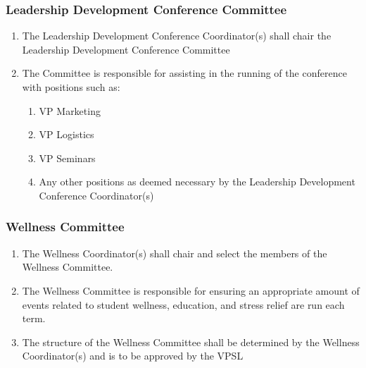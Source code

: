 \subsubsection{Leadership Development Conference Committee}
\label{leadership-development-conference-committee}
\begin{enumerate}
 \item
  The Leadership Development Conference Coordinator(s) shall chair the Leadership Development Conference Committee
 \item
  The Committee is responsible for assisting in the running of the conference with positions such as:

  \begin{enumerate}
   \item
    VP Marketing
   \item
    VP Logistics
   \item
    VP Seminars
   \item
    Any other positions as deemed necessary by the Leadership Development Conference Coordinator(s)

  \end{enumerate}
\end{enumerate}

\subsubsection{Wellness Committee}
\label{wellness-committee}
\begin{enumerate}
 \item
  The Wellness Coordinator(s) shall chair and select the members of the Wellness Committee.
 \item
  The Wellness Committee is responsible for ensuring an appropriate amount of events related to student wellness, education, and stress relief are run each term.
 \item
  The structure of the Wellness Committee shall be determined by the Wellness Coordinator(s) and is to be approved by the VPSL

\end{enumerate}

